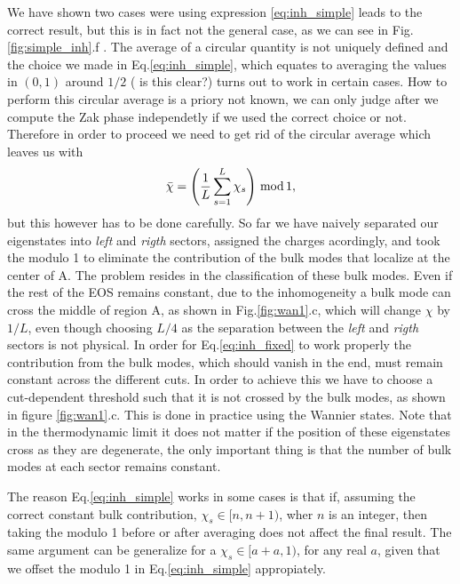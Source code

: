 \documentclass[twocolumn,amsmath,longbibliography,amssymb,superscriptaddress]{revtex4-1}
\newcommand{\carlos}[1]{{\color{red} #1}}
\begin{document}
We have shown two cases were using expression \ref{eq:inh_simple} leads to the correct result, but this is in fact not the general case, as we can see in Fig.\ref{fig:simple_inh}.f . The average of a circular quantity is not uniquely defined and the choice we made in Eq.\ref{eq:inh_simple}, which equates to averaging the values in $(0,1)$ around $1/2$ (\carlos{is this clear?}) turns out to work in certain cases. How to perform this circular average is a priory not known, we can only judge after we compute the Zak phase independetly if we used the correct choice or not. Therefore in order to proceed we need to get rid of the circular average which leaves us with
\begin{align}
\bar{\chi} =\left(\frac{1}{L}\sum_{s=1}^L \chi_s \right)\, \rm{mod} \, 1,
\label{eq:inh_fixed}
\end{align}
but this however has to be done carefully. So far we have naively separated our eigenstates into \emph{left} and \emph{rigth} sectors, assigned the charges acordingly, and took the modulo 1 to eliminate the contribution of the bulk modes that localize at the center of A. The problem resides in the classification of these bulk modes. Even if the rest of the EOS remains constant, due to the inhomogeneity a bulk mode can cross the middle of region A, as shown in Fig.\ref{fig:wan1}.c, which will change $\chi$ by $1/L$, even though choosing $L/4$ as the separation between the \emph{left} and \emph{rigth} sectors is not physical. In order for Eq.\ref{eq:inh_fixed} to work properly the contribution from the bulk modes, which should vanish in the end, must remain constant across the different cuts. In order to achieve this we have to choose a cut-dependent threshold such that it is not crossed by the bulk modes, as shown in figure \ref{fig:wan1}.c. This is done in practice using the Wannier states.
Note that in the thermodynamic limit it does not matter if the position of these eigenstates cross as they are degenerate, the only important thing is that the number of bulk modes at each sector remains constant.

The reason Eq.\ref{eq:inh_simple} works in some cases is that if, assuming the correct constant bulk contribution, $\chi_s \in [n,n+1)$, wher $n$ is an integer, then taking the modulo 1 before or after averaging does not affect the final result. The same argument can be generalize for a $\chi_s \in [a+a,1)$, for any real $a$, given that we offset the modulo 1 in Eq.\ref{eq:inh_simple} appropiately.
\end{document}
